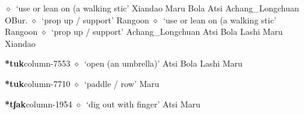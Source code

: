          $\diamond$~`use or lean on (a walking stic'
         Xiandao 
\hspace{1ex}
         Maru 
\hspace{1ex}
         Bola 
\hspace{1ex}
         Atsi 
\hspace{1ex}
         Achang\_Longchuan 
\hspace{1ex}
         OBur. 
\hspace{1ex}
         $\diamond$~`prop up / support'
         Rangoon 
\hspace{1ex}
         $\diamond$~`use or lean on (a walking stic'
         Rangoon 
\hspace{1ex}
         $\diamond$~`prop up / support'
         Achang\_Longchuan 
\hspace{1ex}
         Atsi 
\hspace{1ex}
         Bola 
\hspace{1ex}
         Lashi 
\hspace{1ex}
         Maru 
\hspace{1ex}
         Xiandao 
  \item {\footnotesize \textbf{*tuk}}{\tiny column-7553}
         $\diamond$~`open (an umbrella)'
         Atsi 
\hspace{1ex}
         Bola 
\hspace{1ex}
         Lashi 
\hspace{1ex}
         Maru 
  \item {\footnotesize \textbf{*tuk}}{\tiny column-7710}
         $\diamond$~`paddle / row'
         Maru 
  \item {\footnotesize \textbf{*tʃak}}{\tiny column-1954}
         $\diamond$~`dig out with finger'
         Atsi 
\hspace{1ex}
         Maru 
